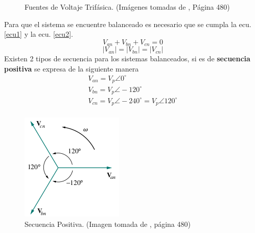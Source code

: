 \documentclass[twocolumn]{IEEEtran}
\begin{document}
\begin{figure}[H]
  \centering
  \hspace{2cm}
  \caption{Fuentes de Voltaje Trifásica. (Imágenes tomadas de \cite{sadiku}, Página 480)}
    \label{fig3}
\end{figure}
\noindent
Para que el sistema se encuentre balanceado es necesario que se cumpla la ecu. \ref{ecu1} y la ecu. \ref{ecu2}.
\begin{equation}
 {V_{an}} + {V_{bn}} + {V_{cn}} = 0
\label{ecu1}
\end{equation}
\begin{equation}
 \left| {V_{an}} \right| = \left| {{V_{bn}}} \right| = \left| {{V_{cn}}} \right|
\label{ecu2}
\end{equation}
\noindent
Existen 2 tipos de secuencia para los sistemas balanceados, si es de \textbf{secuencia positiva} se expresa de la siguiente manera
\begin{equation}
 \begin{array}{l}
 {V_{an}} = {V_p}\angle 0^\circ  \\ 
 {V_{bn}} = {V_p}\angle  - 120^\circ  \\ 
 {V_{cn}} = {V_p}\angle  - 240^\circ  = {V_p}\angle 120^\circ  \\ 
 \end{array}
\label{ecu3}
\end{equation}
\begin{figure}[H]
	\centering
		\includegraphics[scale=0.75]{positiva.png}
	\caption{Secuencia Positiva. (Imagen tomada de \cite{sadiku}, página 480)}
	\label{fig4}
\end{figure}
\end{document}

